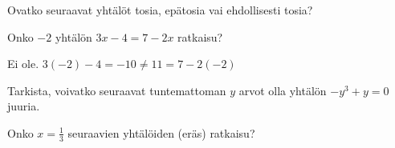 \begin{tehtavasivu}


\begin{tehtava}
Ovatko seuraavat yhtälöt tosia, epätosia vai ehdollisesti tosia?
  \begin{alakohdat}
  \end{alakohdat}

     \begin{vastaus}
	\begin{alakohdat}
	\end{alakohdat}
    \end{vastaus}
\end{tehtava}

\begin{tehtava}
Onko $-2$ yhtälön $3x-4 = 7-2x$ ratkaisu?
\begin{vastaus}
Ei ole. $3(-2)-4 = -10 \ne 11=7-2(-2)$
\end{vastaus}
\end{tehtava}

\begin{tehtava}
Tarkista, voivatko seuraavat tuntemattoman $y$ arvot olla yhtälön $-y^3+y=0$ juuria.
  \begin{alakohdat}
  \end{alakohdat}

  \begin{vastaus}
    \begin{alakohdat}
    \end{alakohdat}
  \end{vastaus}
\end{tehtava}


\begin{tehtava}
Onko $x=\frac{1}{3}$ seuraavien yhtälöiden (eräs) ratkaisu?
  \begin{alakohdat}
  \end{alakohdat}


\end{tehtava}
\end{tehtavasivu}
